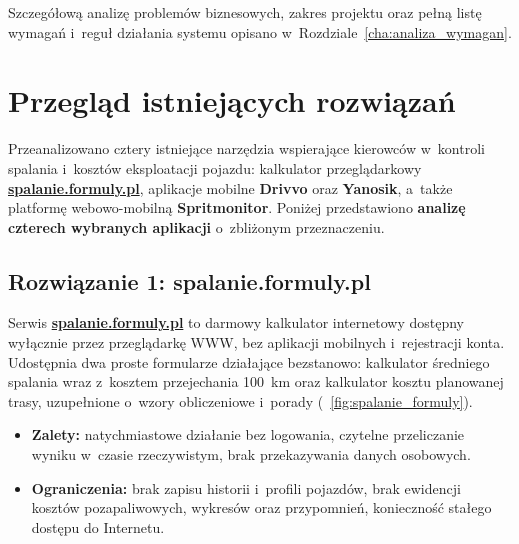 Szczegółową analizę problemów biznesowych, zakres projektu oraz pełną listę wymagań i~reguł działania systemu opisano w~Rozdziale~\ref{cha:analiza_wymagan}.


\section{Przegląd istniejących rozwiązań}
\label{sec:przeglad_rozwiazan}

Przeanalizowano cztery istniejące narzędzia wspierające kierowców w~kontroli spalania i~kosztów eksploatacji pojazdu: kalkulator przeglądarkowy \href{https://spalanie.formuly.pl}{\textbf{spalanie.formuly.pl}}, aplikacje mobilne \textbf{Drivvo} oraz \textbf{Yanosik}, a~także platformę webowo-mobilną \textbf{Spritmonitor}. Poniżej przedstawiono \textbf{analizę czterech wybranych aplikacji} o~zbliżonym przeznaczeniu.

\clearpage

\subsection{Rozwiązanie 1: spalanie.formuly.pl}
\label{subsec:rozwiazanie_1}

Serwis \href{https://spalanie.formuly.pl}{\textbf{spalanie.formuly.pl}} to darmowy kalkulator internetowy dostępny wyłącznie przez przeglądarkę WWW, bez aplikacji mobilnych i~rejestracji konta. Udostępnia dwa proste formularze działające bezstanowo: kalkulator średniego spalania wraz z~kosztem przejechania 100~km oraz kalkulator kosztu planowanej trasy, uzupełnione o~wzory obliczeniowe i~porady (\figurename~\ref{fig:spalanie_formuly}).

\begin{itemize}
    \item \textbf{Zalety:} natychmiastowe działanie bez logowania, czytelne przeliczanie wyniku w~czasie rzeczywistym, brak przekazywania danych osobowych.
    \item \textbf{Ograniczenia:} brak zapisu historii i~profili pojazdów, brak ewidencji kosztów pozapaliwowych, wykresów oraz przypomnień, konieczność stałego dostępu do Internetu.
\end{itemize}

